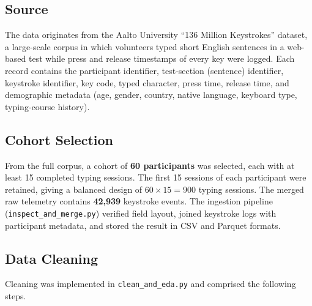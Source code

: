 \subsection*{Source}
The data originates from the Aalto University ``136 Million Keystrokes'' dataset, a large-scale corpus in which volunteers typed short English sentences in a web-based test while press and release timestamps of every key were logged. Each record contains the participant identifier, test-section (sentence) identifier, keystroke identifier, key code, typed character, press time, release time, and demographic metadata (age, gender, country, native language, keyboard type, typing-course history).

\subsection*{Cohort Selection}
From the full corpus, a cohort of \textbf{60 participants} was selected, each with at least 15 completed typing sessions. The first 15 sessions of each participant were retained, giving a balanced design of $60\times15=900$ typing sessions. The merged raw telemetry contains \textbf{42{,}939} keystroke events. The ingestion pipeline (\texttt{inspect\_and\_merge.py}) verified field layout, joined keystroke logs with participant metadata, and stored the result in CSV and Parquet formats.

\subsection{Data Cleaning}
\label{subsec:cleaning}
Cleaning was implemented in \texttt{clean\_and\_eda.py} and comprised the following steps.

